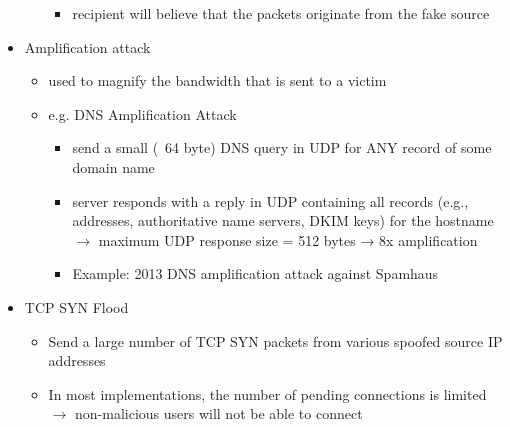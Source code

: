 \documentclass[final]{article}
\begin{document}
\begin{itemize}[nosep]
\begin{itemize}[nosep]
\begin{itemize}[nosep]
                        \item recipient will believe that the packets originate from the fake source
                    \end{itemize}
          \end{itemize}
    \item Amplification attack
          \begin{itemize}[nosep]
              \item used to magnify the bandwidth that is sent to a victim
              \item e.g. DNS Amplification Attack
                    \begin{itemize}[nosep]
                        \item send a small (~64 byte) DNS query in UDP for ANY record of some domain name
                        \item server responds with a reply in UDP containing all records (e.g., addresses, authoritative name servers, DKIM keys) for the hostname $\rightarrow$ maximum UDP response size = 512 bytes → 8x amplification
                        \item Example: 2013 DNS amplification attack against Spamhaus
                    \end{itemize}
          \end{itemize}
    \item TCP SYN Flood
          \begin{itemize}[nosep]
              \item Send a large number of TCP SYN packets from various spoofed source IP addresses
              \item In most implementations, the number of pending connections is limited $\rightarrow$ non-malicious users will not be able to connect
          \end{itemize}
\end{itemize}
\end{document}
